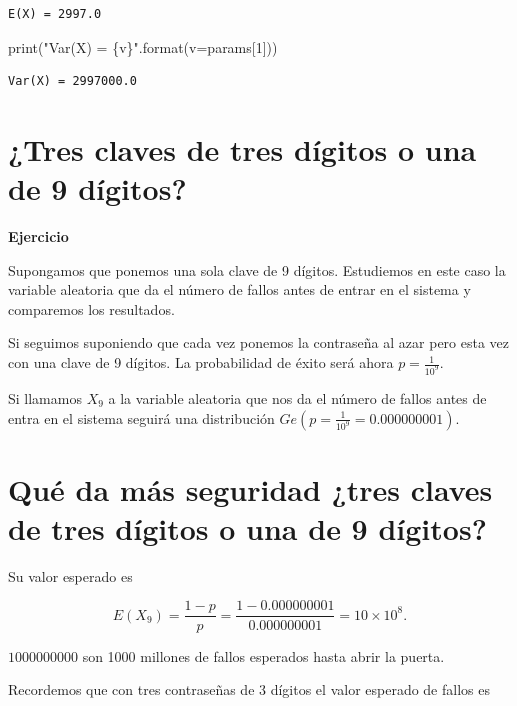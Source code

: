 \documentclass[
  letterpaper,
  DIV=11,
  numbers=noendperiod]{scrreprt}
\newenvironment{Shaded}{\begin{snugshade}}{\end{snugshade}}
\newcommand{\BuiltInTok}[1]{\textcolor[rgb]{0.00,0.23,0.31}{#1}}
\newcommand{\DecValTok}[1]{\textcolor[rgb]{0.68,0.00,0.00}{#1}}
\newcommand{\NormalTok}[1]{\textcolor[rgb]{0.00,0.23,0.31}{#1}}
\newcommand{\OperatorTok}[1]{\textcolor[rgb]{0.37,0.37,0.37}{#1}}
\newcommand{\SpecialCharTok}[1]{\textcolor[rgb]{0.37,0.37,0.37}{#1}}
\newcommand{\StringTok}[1]{\textcolor[rgb]{0.13,0.47,0.30}{#1}}
\begin{document}
\begin{verbatim}
E(X) = 2997.0
\end{verbatim}

\begin{Shaded}
\begin{Highlighting}[]
\BuiltInTok{print}\NormalTok{(}\StringTok{"Var(X) = }\SpecialCharTok{\{v\}}\StringTok{"}\NormalTok{.}\BuiltInTok{format}\NormalTok{(v}\OperatorTok{=}\NormalTok{params[}\DecValTok{1}\NormalTok{]))}
\end{Highlighting}
\end{Shaded}

\begin{verbatim}
Var(X) = 2997000.0
\end{verbatim}

\section{¿Tres claves de tres dígitos o una de 9
dígitos?}\label{tres-claves-de-tres-duxedgitos-o-una-de-9-duxedgitos}

\textbf{Ejercicio}

Supongamos que ponemos una sola clave de 9 dígitos. Estudiemos en este
caso la variable aleatoria que da el número de fallos antes de entrar en
el sistema y comparemos los resultados.

Si seguimos suponiendo que cada vez ponemos la contraseña al azar pero
esta vez con una clave de 9 dígitos. La probabilidad de éxito será ahora
\(p=\frac{1}{10^{9}}\).

Si llamamos \(X_9\) a la variable aleatoria que nos da el número de
fallos antes de entra en el sistema seguirá una distribución
\(Ge(p=\frac{1}{10^9}=0.000000001)\).

\section{Qué da más seguridad ¿tres claves de tres dígitos o una de 9
dígitos?}\label{quuxe9-da-muxe1s-seguridad-tres-claves-de-tres-duxedgitos-o-una-de-9-duxedgitos}

Su valor esperado es

\[
E(X_9)=\frac{1-p}{p}=\frac{1-0.000000001}{0.000000001}=\ensuremath{10\times 10^{8}}.
\]

\(1000 000 000\) son 1000 millones de fallos esperados hasta abrir la
puerta.

Recordemos que con tres contraseñas de 3 dígitos el valor esperado de
fallos es
\end{document}
